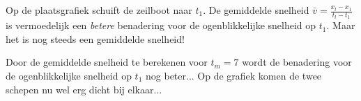 \documentclass{ximera}
\begin{document}
Op de plaatsgrafiek schuift de zeilboot naar \(t_1\). 
De gemiddelde snelheid \(\bar{v} = \frac{x_l - x_1}{t_l-t_1}\) is vermoedelijk een \textit{betere} benadering voor de ogenblikkelijke snelheid op \(t_1\). 
Maar het is nog steeds een gemiddelde snelheid! 

Door de gemiddelde snelheid te berekenen voor \(t_m = 7\) wordt de benadering voor de ogenblikkelijke snelheid op \(t_1\) nog beter... 
Op de grafiek komen de twee schepen nu wel erg dicht bij elkaar... 



\end{document}
